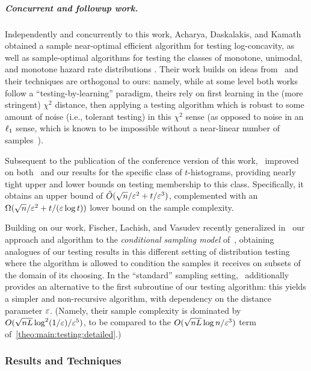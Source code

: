 \subparagraph{Concurrent and followup work.} 
Independently and concurrently to this work, Acharya, Daskalakis, and Kamath~\cite{ADK:15} obtained a sample near-optimal efficient algorithm for testing log-concavity, as well as sample-optimal algorithms for testing the classes of monotone, unimodal, and monotone hazard rate distributions . Their work builds on ideas from~\cite{AD:15} and their techniques are orthogonal to ours: namely, while at some level both works follow a ``testing-by-learning'' paradigm, theirs rely on first learning in the (more stringent) $\chi^2$ distance, then applying a testing algorithm which is robust to some amount of noise (i.e., tolerant testing) in this $\chi^2$ sense (as opposed to noise in an $\lp[1]$ sense, which is known to be impossible without a near-linear number of samples~\cite{ValiantValiant:10lb}).

Subsequent to the publication of the conference version of this work,~\cite{Canonne:16} improved on both~\cite{ILR:12} and our results for the specific class of $t$-histograms, providing nearly tight upper and lower bounds on testing membership to this class. Specifically, it obtains an upper bound of $\tilde{O}(\sqrt{n}/\eps^2 + t/\eps^3)$, complemented with an $\Omega(\sqrt{n}/\eps^2+t/(\eps\log t))$ lower bound on the sample complexity.

Building on our work, Fischer, Lachish, and Vasudev recently generalized in~\cite{FischerLV:16} our approach and algorithm to the \emph{conditional sampling model} of~\cite{CFGM:13,CRS:15}, obtaining analogues of our testing results in this different setting of distribution testing where the algorithm is allowed to condition the samples it receives on subsets of the domain of its choosing. In the ``standard'' sampling setting,~\cite{FischerLV:16} additionally provides an alternative to the first subroutine of our testing algorithm: this yields a simpler and non-recursive algorithm, with  dependency on the distance parameter $\eps$. (Namely, their sample complexity is dominated by $O(\sqrt{nL}\log^2(1/\eps)/{\eps^5})$, to be compared to the $O(\sqrt{nL}\log n/{\eps^3})$ term of~\cref{theo:main:testing:detailed}.)

\subsubsection{Results and Techniques}

